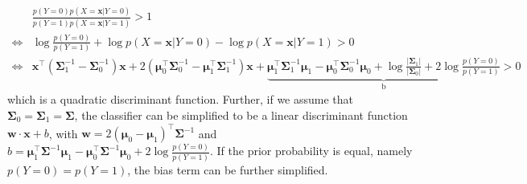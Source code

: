 \documentclass{article}
\begin{document}
	\begin{equation*}
	\begin{split}
	&\frac{p(Y=0) p(X=\bm{x}|Y=0)}{p(Y=1) p(X=\bm{x}|Y=1)} > 1 \\
	\iff &\log \frac{p(Y=0)}{p(Y=1)} + \log p(X=\bm{x}|Y=0) - \log p(X=\bm{x}|Y=1) > 0 \\
	\iff &\bm{x}^\top ( \bm{\Sigma}_1^{-1} - \bm{\Sigma}_0^{-1}) \bm{x} + 2 (\bm{\mu}_0^\top\bm{\Sigma}_0^{-1} - \bm{\mu}_1^\top\bm{\Sigma}_1^{-1}) \bm{x} + \underbrace{\bm{\mu}_1^\top\bm{\Sigma}_1^{-1}\bm{\mu}_1 - \bm{\mu}_0^\top\bm{\Sigma}_0^{-1}\bm{\mu}_0 + \log\frac{|\bm{\Sigma}_1|}{|\bm{\Sigma}_0|} + 2\log \frac{p(Y=0)}{p(Y=1)}}_{\mathrm{b}} > 0
	\end{split}
	\end{equation*}
which is a quadratic discriminant function. Further, if we assume that $\bm{\Sigma}_0=\bm{\Sigma}_1=\bm{\Sigma}$, the classifier can be simplified to be a linear discriminant function $\bm{w}\cdot\bm{x}+b$, with $\bm{w}=2(\bm{\mu}_0 - \bm{\mu}_1)^\top\bm{\Sigma}^{-1}$ and $b=\bm{\mu}_1^\top\bm{\Sigma}^{-1}\bm{\mu}_1 - \bm{\mu}_0^\top\bm{\Sigma}^{-1}\bm{\mu}_0+ 2\log \frac{p(Y=0)}{p(Y=1)}$. If the prior probability is equal, namely $p(Y=0)=p(Y=1)$, the bias term can be further simplified.
	
\end{document}
